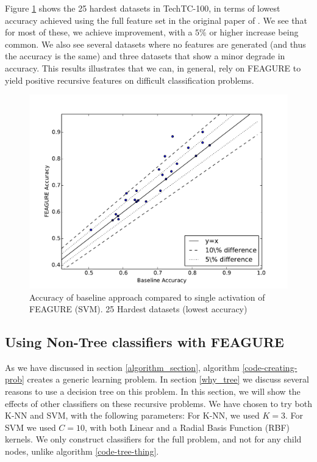 \documentclass[twoside,11pt]{article}
\theoremstyle{definition}
\begin{document}
Figure \ref{fig:25best} shows the 25 hardest datasets in TechTC-100, in terms of lowest accuracy achieved using the full feature set in the original paper of . We see that for most of these, we achieve improvement, with a $5\%$ or higher increase being common. We also see several datasets where no features are generated (and thus the accuracy is the same) and three datasets that show a minor degrade in accuracy. This results illustrates that we can, in general, rely on FEAGURE to yield positive recursive features on difficult classification problems.

\begin{figure}
	\centering
	\includegraphics[width=0.8\linewidth]{25best}
	\caption{Accuracy of
		baseline approach compared to single activation of FEAGURE (SVM). 25 Hardest datasets (lowest accuracy)}
	\label{fig:25best}
\end{figure}

\subsection{Using Non-Tree classifiers with FEAGURE}

As we have discussed in section \ref{algorithm_section}, algorithm \ref{code-creating-prob} creates a generic learning problem. In section \ref{why_tree} we discuss several reasons to use a decision tree on this problem. In this section, we will show the effects of other classifiers on these recursive problems. We have chosen to try both K-NN and SVM, with the following parameters: For K-NN, we used $K=3$. For SVM we used $C=10$, with both Linear and a Radial Basis Function (RBF) kernels. We only construct classifiers for the full problem, and not for any child nodes, unlike algorithm \ref{code-tree-thing}.
\end{document}
